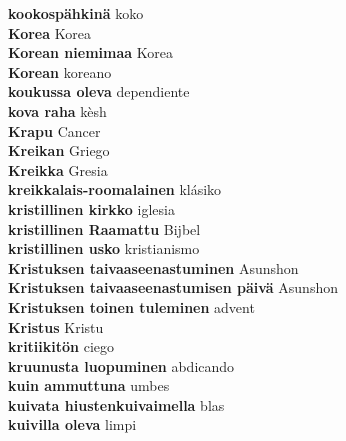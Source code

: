 \textbf{ kookospähkinä  } koko \\
\textbf{ Korea  } Korea \\
\textbf{ Korean niemimaa  } Korea \\
\textbf{ Korean  } koreano \\
\textbf{ koukussa oleva  } dependiente \\
\textbf{ kova raha  } kèsh \\
\textbf{ Krapu  } Cancer \\
\textbf{ Kreikan  } Griego \\
\textbf{ Kreikka  } Gresia \\
\textbf{ kreikkalais-roomalainen  } klásiko \\
\textbf{ kristillinen kirkko  } iglesia \\
\textbf{ kristillinen Raamattu  } Bijbel \\
\textbf{ kristillinen usko  } kristianismo \\
\textbf{ Kristuksen taivaaseenastuminen  } Asunshon \\
\textbf{ Kristuksen taivaaseenastumisen päivä  } Asunshon \\
\textbf{ Kristuksen toinen tuleminen  } advent \\
\textbf{ Kristus  } Kristu \\
\textbf{ kritiikitön  } ciego \\
\textbf{ kruunusta luopuminen  } abdicando \\
\textbf{ kuin ammuttuna  } umbes \\
\textbf{ kuivata hiustenkuivaimella  } blas \\
\textbf{ kuivilla oleva  } limpi \\
